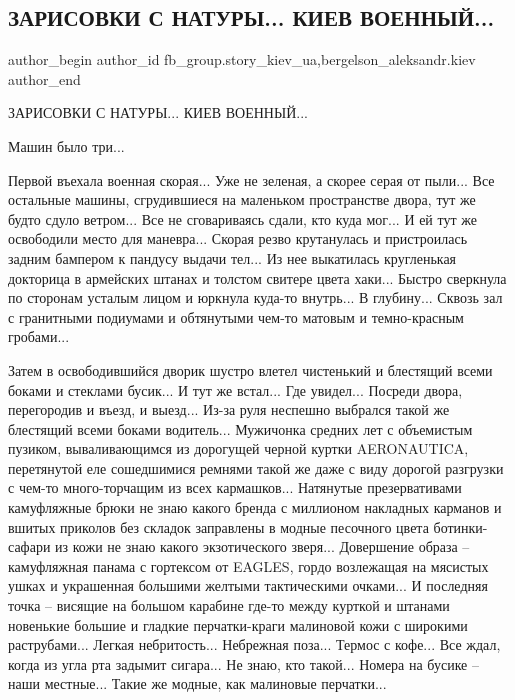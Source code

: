  
 
 
 
 
 
\subsection{ЗАРИСОВКИ С НАТУРЫ... КИЕВ ВОЕННЫЙ...}
\label{sec:30_03_2022.fb.fb_group.story_kiev_ua.1.zarisovki_kiev}
 
\ifcmt
 author_begin
   author_id fb_group.story_kiev_ua,bergelson_aleksandr.kiev
 author_end
\fi

ЗАРИСОВКИ С НАТУРЫ... КИЕВ ВОЕННЫЙ...

Машин было три...

Первой въехала военная скорая... Уже не зеленая, а скорее серая от пыли... Все
остальные машины, сгрудившиеся на маленьком пространстве двора, тут же будто
сдуло ветром... Все не сговариваясь сдали, кто куда мог... И ей тут же
освободили место для маневра... Скорая резво крутанулась и пристроилась задним
бампером к пандусу выдачи тел... Из нее выкатилась кругленькая докторица в
армейских штанах и толстом свитере цвета хаки... Быстро сверкнула по сторонам
усталым лицом и юркнула куда-то внутрь... В глубину... Сквозь зал с гранитными
подиумами и обтянутыми чем-то матовым и темно-красным гробами...

Затем в освободившийся дворик шустро влетел чистенький и блестящий всеми боками
и стеклами бусик... И тут же встал... Где увидел... Посреди двора, перегородив
и въезд, и выезд... Из-за руля неспешно выбрался такой же блестящий всеми
боками водитель... Мужичонка средних лет с объемистым пузиком, вываливающимся
из дорогущей черной куртки AERONAUTICA, перетянутой еле сошедшимися ремнями
такой же даже с виду дорогой разгрузки с чем-то много-торчащим из всех
кармашков...  Натянутые презервативами камуфляжные брюки не знаю какого бренда
с миллионом накладных карманов и вшитых приколов без складок заправлены в
модные песочного цвета ботинки-сафари из кожи не знаю какого экзотического
зверя... Довершение образа – камуфляжная панама с гортексом от EAGLES, гордо
возлежащая на мясистых ушках и украшенная большими желтыми тактическими
очками... И последняя точка – висящие на большом карабине где-то между курткой
и штанами новенькие большие и гладкие перчатки-краги малиновой кожи с широкими
раструбами... Легкая небритость...  Небрежная поза... Термос с кофе... Все
ждал, когда из угла рта задымит сигара... Не знаю, кто такой... Номера на
бусике – наши местные... Такие же модные, как малиновые перчатки...

